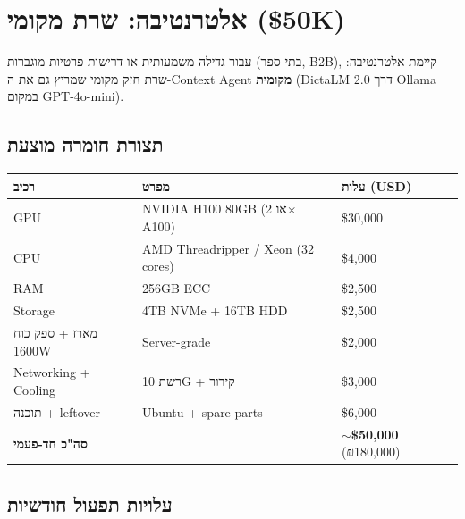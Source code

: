\documentclass[11pt]{article}
\newcommand{\en}[1]{\textenglish{#1}}
\begin{document}
\section{אלטרנטיבה: שרת מקומי (\en{\$50K})}

עבור גדילה משמעותית או דרישות פרטיות מוגברות (בתי ספר, \en{B2B}), קיימת אלטרנטיבה: שרת חזק מקומי שמריץ גם את ה-\en{Context Agent} \textbf{מקומית} (\en{DictaLM 2.0} דרך \en{Ollama} במקום \en{GPT-4o-mini}).

\subsection*{תצורת חומרה מוצעת}

\begin{longtable}{|>{\raggedright\arraybackslash}p{3.5cm}|>{\raggedright\arraybackslash}p{6.5cm}|>{\raggedright\arraybackslash}p{3.0cm}|}
\hline
\rowcolor{hdr}
\textbf{רכיב} & \textbf{מפרט} & \textbf{עלות (\en{USD})} \\
\hline
\endhead
\en{GPU} & \en{NVIDIA H100 80GB} (או \en{2}$\times$\en{A100}) & \en{\$30,000} \\ \hline
\rowcolor{ltgray}
\en{CPU} & \en{AMD Threadripper / Xeon} (\en{32 cores}) & \en{\$4,000} \\ \hline
\en{RAM} & \en{256GB ECC} & \en{\$2,500} \\ \hline
\rowcolor{ltgray}
\en{Storage} & \en{4TB NVMe} + \en{16TB HDD} & \en{\$2,500} \\ \hline
מארז + ספק כוח \en{1600W} & \en{Server-grade} & \en{\$2,000} \\ \hline
\rowcolor{ltgray}
\en{Networking + Cooling} & רשת \en{10G} + קירור & \en{\$3,000} \\ \hline
תוכנה + \en{leftover} & \en{Ubuntu} + \en{spare parts} & \en{\$6,000} \\ \hline
\textbf{סה"כ חד-פעמי} & & \textbf{$\sim$\en{\$50,000}} (₪\en{180,000}) \\ \hline
\end{longtable}

\subsection*{עלויות תפעול חודשיות}
\end{document}
